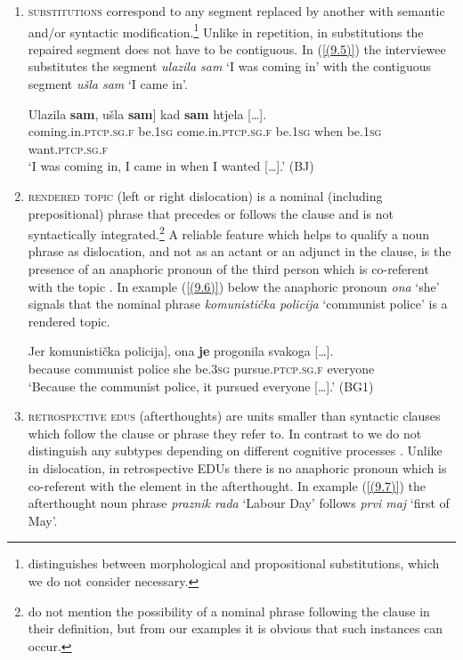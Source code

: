 \begin{enumerate}
\item \textsc{substitutions} correspond to any segment replaced by another with semantic and/or syntactic modification.\footnote{\citet[74]{Crible18} distinguishes between morphological and propositional substitutions, which we do not consider necessary.} Unlike in repetition, in substitutions the repaired segment does not have to be contiguous. In (\ref{(9.5)}) the interviewee substitutes the segment \textit{ulazila sam} `I was coming in' with the contiguous segment \textit{ušla sam} ‘I came in’.

\begin{exe}\ex\label{(9.5)}
\gll \minsp{[} Ulazila \textbf{sam}, ušla \textbf{sam}] kad \textbf{sam} {htjela  [\dots].}\\
{} coming.in.\textsc{ptcp}.\textsc{sg}.\textsc{f} be.1\textsc{sg} come.in.\textsc{ptcp}.\textsc{sg}.\textsc{f} be.1\textsc{sg} when be.1\textsc{sg} want.\textsc{ptcp}.\textsc{sg}.\textsc{f}\\
\glt `I was coming in, I came in when I wanted  [\dots].'
\hfill (BJ)
\end{exe}

\item \textsc{rendered topic} (left or right dislocation) is a nominal (including prepositional) phrase that precedes or follows the clause and is not syntactically integrated.\footnote{\citet[7]{KibrikPodlesskaya06} do not mention the possibility of a nominal phrase following the clause in their definition, but from our examples it is obvious that such instances can occur.} A reliable feature which helps to qualify a noun phrase as dislocation, and not as an actant or an adjunct in the clause, is the presence of an anaphoric pronoun of the third person which is co-referent with the topic \citep[cf.][7]{KibrikPodlesskaya06}. In example (\ref{(9.6)}) below the anaphoric pronoun \textit{ona} ‘she’ signals that the nominal phrase \textit{komunistička policija} ‘communist police’ is a rendered topic.

\begin{exe}\ex\label{(9.6)}
\gll Jer \minsp{[} komunistička policija], ona \textbf{je} progonila {svakoga  [\dots].} \\
because {} communist police she be.3\textsc{sg} pursue.\textsc{ptcp}.\textsc{sg}.\textsc{f} everyone \\
\glt ‘Because the communist police, it pursued everyone  [\dots].’
\hfill (BG1)
\end{exe}

\item \begin{sloppypar}\textsc{retrospective edus} (afterthoughts) are units smaller than syntactic clauses which follow the clause or phrase they refer to. In contrast to \citet{KibrikPodlesskaya06} we do not distinguish any subtypes depending on different cognitive processes \citep[cf.][10]{KibrikPodlesskaya06}. Unlike in dislocation, in retrospective EDUs there is no anaphoric pronoun which is co-referent with the element in the afterthought. In example (\ref{(9.7)}) the afterthought noun phrase \textit{praznik rada} ‘Labour Day’ follows \textit{prvi maj} ‘first of May’.\end{sloppypar}


\end{enumerate}
